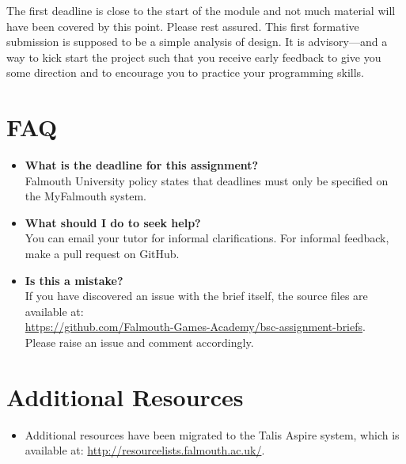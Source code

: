 \documentclass{../../fal_assignment}
\begin{document}
The first deadline is  close to the start of the module and not much material will have been covered by this point. Please rest assured. This first formative submission is supposed to be a simple analysis of design. It is advisory---and a way to kick start the project such that you receive early feedback to give you some direction and to encourage you to practice your programming skills.

\section*{FAQ}

\begin{itemize}
	\item 	\textbf{What is the deadline for this assignment?} \\ 
    		Falmouth University policy states that deadlines must only be specified on the MyFalmouth system.
    		
	\item 	\textbf{What should I do to seek help?} \\ 
    		You can email your tutor for informal clarifications. For informal feedback, make a pull request on GitHub. 
    		
    	\item 	\textbf{Is this a mistake?} \\ 	
    		If you have discovered an issue with the brief itself, the source files are available at: \\
    		\url{https://github.com/Falmouth-Games-Academy/bsc-assignment-briefs}.\\
    		 Please raise an issue and comment accordingly.
\end{itemize}

\section*{Additional Resources}

\begin{itemize}
    \item Additional resources have been migrated to the Talis Aspire system, which is available at: \url{http://resourcelists.falmouth.ac.uk/}.
\end{itemize}
\end{document}
